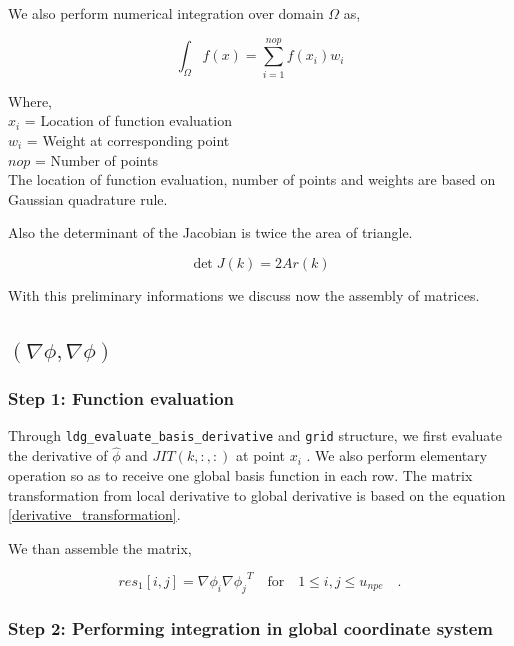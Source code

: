 \documentclass[a4paper,openany]{book}
\begin{document}
We also perform numerical integration over domain $\Omega$ as,

\begin{equation}\label{numerical integration}
\int_{\Omega} f(x) = \sum_{i=1}^{nop} f(x_i) w_i
\end{equation}

Where, \\

$x_i$ = Location of function evaluation\\
$w_i$ = Weight at corresponding point\\
$nop$ = Number of points\\

The location of function evaluation, number of points and weights are based on Gaussian quadrature rule.

Also the determinant of the Jacobian is twice the area of triangle.

\begin{equation}\label{determinant to area}
\det J(k) = 2Ar(k)
\end{equation}

With this preliminary informations we discuss now the assembly of matrices.

\subsection{$(\nabla \phi, \nabla \phi)$}

\subsubsection{Step 1: Function evaluation}

Through \verb|ldg_evaluate_basis_derivative| and \verb|grid| structure, we first evaluate the derivative of $\hat{\phi}$ and $JIT(k,:,:)$ at point $x_i$ . We also perform elementary operation so as to receive one global basis function in each row. The matrix transformation from local derivative to global derivative is based on the equation \ref{derivative_transformation}.

We than assemble the matrix,
 
\begin{equation}
res_1[i,j]= {\nabla \phi_i} {\nabla \phi_j}^T \quad \textrm{for} \quad 1 \leq i,j \leq u_{npe} \quad \textrm{.}
\end{equation}

\subsubsection{Step 2: Performing integration in global coordinate system}
\end{document}
